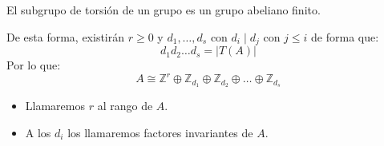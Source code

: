 \begin{prop}
    El subgrupo de torsión de un grupo es un grupo abeliano finito.
\end{prop}
De esta forma, existirán $r\geq 0$ y $d_1,\ldots,d_s$ con $d_i\mid d_j$ con $j\leq i$ de forma que:
\begin{equation*}
    d_1d_2\ldots d_s = |T(A)|
\end{equation*}
Por lo que:
\begin{equation*}
    A \cong \mathbb{Z}^r \oplus \mathbb{Z}_{d_1} \oplus \mathbb{Z}_{d_2} \oplus \ldots \oplus \mathbb{Z}_{d_s}
\end{equation*}

\begin{itemize}
    \item Llamaremos $r$ al rango de $A$.
    \item A los $d_i$ los llamaremos factores invariantes de $A$.
\end{itemize}

